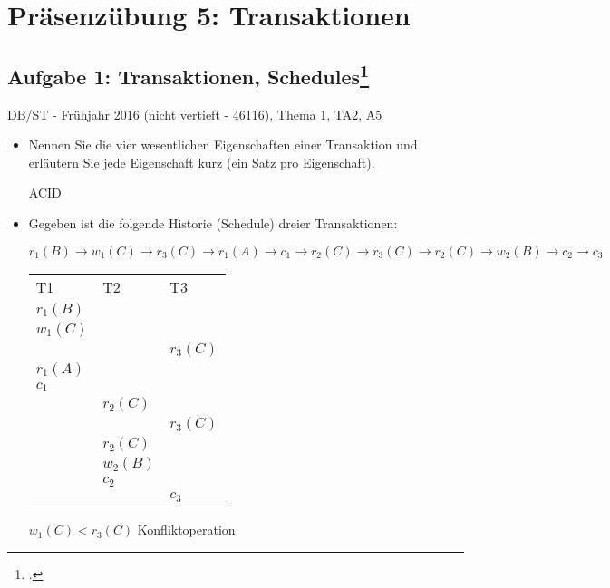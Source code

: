 \documentclass{lehramt-informatik}
\begin{document}
\chapter{Präsenzübung 5: Transaktionen}

\section{Aufgabe 1: Transaktionen, Schedules\footcite{db:pu:5}}

DB/ST - Frühjahr 2016 (nicht vertieft - 46116), Thema 1, TA2, A5

\begin{itemize}
\item Nennen Sie die vier wesentlichen Eigenschaften einer Transaktion
und erläutern Sie jede Eigenschaft kurz (ein Satz pro Eigenschaft).

\begin{antwort}
ACID
\end{antwort}

\item Gegeben ist die folgende Historie (Schedule) dreier Transaktionen:

$
r_1 (B) \rightarrow
w_1 (C) \rightarrow
r_3 (C) \rightarrow
r_1 (A) \rightarrow
c_1 \rightarrow
r_2 (C) \rightarrow
r_3 (C) \rightarrow
r_2 (C) \rightarrow
w_2 (B) \rightarrow
c_2 \rightarrow
c_3
$

\begin{antwort}
\begin{tabular}{lll}
T1 & T2 & T3 \\
$r_1 (B)$ &           &           \\
$w_1 (C)$ &           &           \\
          &           & $r_3 (C)$ \\
$r_1 (A)$ &           &           \\
$c_1$     &           &           \\
          & $r_2 (C)$ &           \\
          &           & $r_3 (C)$ \\
          & $r_2 (C)$ &           \\
          & $w_2 (B)$ &           \\
          & $c_2$     &           \\
          &           & $c_3$     \\
\end{tabular}

$w_1 (C) < r_3 (C)$ Konfliktoperation


\end{antwort}
\end{itemize}
\end{document}
